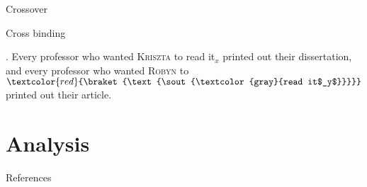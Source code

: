 \documentclass{beamer}
\newcommand{\elide}[1]{\ensuremath{\textcolor{red}{\braket{\text{\sout{\textcolor{gray}{#1}}}}}}}
\begin{document}
\begin{frame}{Crossover}


\end{frame}

\begin{frame}{Cross binding}

\ex. Every professor who wanted \textsc{Kriszta} to read it$_x$ printed out their dissertation, and
every professor who wanted \textsc{Robyn} to \elide{read it$_y$} printed out their article.

\end{frame}


\section{Analysis}



\begin{frame}[allowframebreaks]{References}

  \printbibliography[heading=none]

\end{frame}
\end{document}

